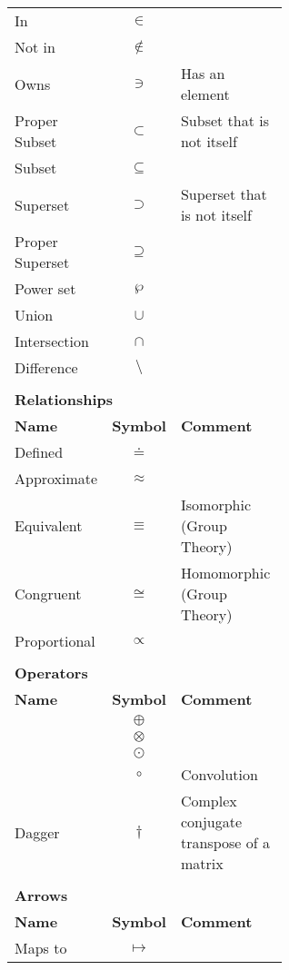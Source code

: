 \documentclass[12pt, english]{book}
\begin{document}
\begin{tabularx}{\textwidth}{ l c p{0.6\linewidth}}
 		In 						& $\in$ 			& \\
 		Not in 					& $\nin$			& \\
 		Owns 					& $\ni$				& Has an element \\
 		
 		Proper Subset 			& $\subset$			& Subset that is not itself \\
 		Subset 					& $\subseteq$		& \\
 		Superset 				& $\supset$ 		& Superset that is not itself\\
 		Proper Superset 		& $\supseteq$		& \\
 		Power set				& $\wp$				& \\
 		Union 					& $\cup$			& \\
 		Intersection			& $\cap$			& \\
 		Difference				& $\setminus$		& \\
 		\hline
 		
 		& & \\
 		\multicolumn{3}{l}{\textbf{{\large Relationships}}} \\ [10pt]
 		\hline
 		\textbf{Name} & \textbf{Symbol} & \textbf{Comment} \\
 		\hline
 		Defined 				& $\doteq$ 			& \\
 		Approximate 			& $\approx$			& \\
 		Equivalent				& $\equiv$	 		& Isomorphic (Group Theory) \\
 		Congruent 				& $\cong$			& Homomorphic (Group Theory) \\
 		Proportional 			& $\propto$			& \\
 		\hline
 		
 		& & \\
 		\multicolumn{3}{l}{\textbf{{\large Operators}}} \\ [10pt]
 		\hline
 		\textbf{Name} & \textbf{Symbol} & \textbf{Comment} \\
 		\hline
 		& $\oplus$ & \\
 		& $\otimes$ & \\
 		& $\odot$ & \\
 		& $\circ$ & Convolution \\
 		Dagger& $\dagger$ & Complex conjugate transpose of a matrix \\
 		\hline
 		
 		& & \\
 		\multicolumn{3}{l}{\textbf{{\large Arrows}}} \\ [10pt]
 		\hline
 		\textbf{Name} & \textbf{Symbol} & \textbf{Comment} \\
 		\hline
 		Maps to 				& $\mapsto$			& \\
 		\hline
 		

\end{tabularx}
\end{document}
